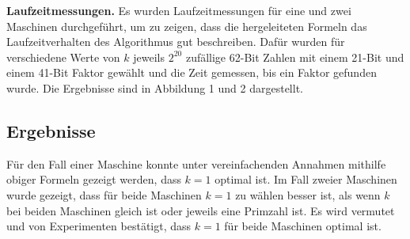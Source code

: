 \documentclass[a4paper, extrafontsizes, ngerman, 25pt]{memoir}
\begin{document}
\noindent \textbf{Laufzeitmessungen.} Es wurden Laufzeitmessungen für eine und zwei Maschinen durchgeführt, um zu zeigen, dass die hergeleiteten Formeln das Laufzeitverhalten des Algorithmus gut beschreiben. Dafür wurden für verschiedene Werte von $k$ jeweils $2^{20}$ zufällige 62-Bit Zahlen mit einem 21-Bit und einem 41-Bit Faktor gewählt und die Zeit gemessen, bis ein Faktor gefunden wurde. Die Ergebnisse sind in Abbildung 1 und 2 dargestellt.

\subsection{Ergebnisse}

Für den Fall einer Maschine konnte unter vereinfachenden Annahmen mithilfe obiger Formeln gezeigt werden, dass $k = 1$ optimal ist. Im Fall zweier Maschinen wurde gezeigt, dass für beide Maschinen $k = 1$ zu wählen besser ist, als wenn $k$ bei beiden Maschinen gleich ist oder jeweils eine Primzahl ist. Es wird vermutet und von Experimenten bestätigt, dass $k = 1$ für beide Maschinen optimal ist.
\end{document}

